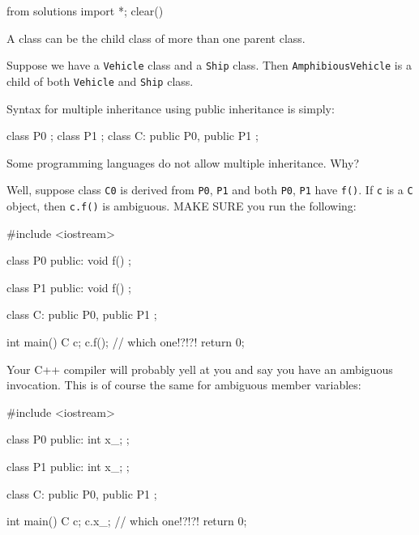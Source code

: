 \begin{python0}
from solutions import *; clear()
\end{python0}

A class can be the child class of more than one parent class.

Suppose we have a \verb!Vehicle! class and a \verb!Ship! class. Then \verb!AmphibiousVehicle! is a child of both \verb!Vehicle! and \verb!Ship! class.

Syntax for multiple inheritance using public inheritance is simply:

\begin{console}
class P0 {};
class P1 {};
class C: public P0, public P1 {}; 
\end{console}

Some programming languages do not allow multiple inheritance. Why?

Well, suppose class \verb!C0! is derived from \verb!P0!, \verb!P1! and both \verb!P0!, \verb!P1! have \verb!f()!. If \verb!c! is a \verb!C! object, then \verb!c.f()! is ambiguous. MAKE SURE you run the following:
\begin{console}
#include <iostream>

class P0
{
public:
        void f() {}
};

class P1
{
public:
        void f() {}
};

class C: public P0, public P1
{};

int main()
{   
    C c;
    c.f(); // which one!?!?!
    return 0;
}
\end{console}

Your C++ compiler will probably yell at you and say you have an
ambiguous invocation. This is of course the same for ambiguous member
variables:
\begin{console}
#include <iostream>

class P0
{
public:
        int x_;
};

class P1
{
public:
        int x_;
};

class C: public P0, public P1
{};

int main()
{   
    C c;
    c.x_; // which one!?!?!
    return 0;
}
\end{console}

